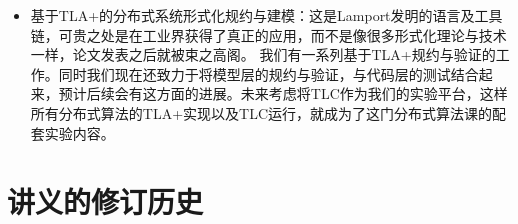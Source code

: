 \documentclass[UTF8]{ctexrep}
\begin{document}
\begin{itemize}
    
    
    \item 基于TLA+的分布式系统形式化规约与建模：这是Lamport发明的语言及工具链，可贵之处是在工业界获得了真正的应用，而不是像很多形式化理论与技术一样，论文发表之后就被束之高阁。
    我们有一系列基于TLA+规约与验证的工作。同时我们现在还致力于将模型层的规约与验证，与代码层的测试结合起来，预计后续会有这方面的进展。未来考虑将TLC作为我们的实验平台，这样所有分布式算法的TLA+实现以及TLC运行，就成为了这门分布式算法课的配套实验内容。
\end{itemize}


%
%
%


\chapter{讲义的修订历史}
\end{document}
